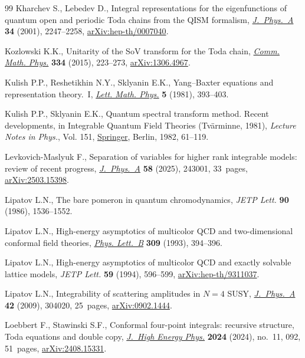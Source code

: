 \documentclass[pdftex]{sigma}
\numberwithin{equation}{section}
\begin{document}
\begin{thebibliography}{99}
Kharchev S., Lebedev D., Integral representations for the eigenfunctions of
 quantum open and periodic {T}oda chains from the {QISM} formalism,
 \href{https://doi.org/10.1088/0305-4470/34/11/317}{\textit{J.~Phys.~A}}
 \textbf{34} (2001), 2247--2258,
 \href{http://arxiv.org/abs/hep-th/0007040}{arXiv:hep-th/0007040}.

Kozlowski K.K., Unitarity of the {S}o{V} transform for the {T}oda chain,
 \href{https://doi.org/10.1007/s00220-014-2134-6}{\textit{Comm. Math. Phys.}}
 \textbf{334} (2015), 223--273,
 \href{http://arxiv.org/abs/1306.4967}{arXiv:1306.4967}.

Kulish P.P., Reshetikhin N.Y., Sklyanin E.K., {Y}ang--{B}axter equations and
 representation theory.~{I},
 \href{https://doi.org/10.1007/BF02285311}{\textit{Lett. Math. Phys.}}
 \textbf{5} (1981), 393--403.

Kulish P.P., Sklyanin E.K., Quantum spectral transform method. {R}ecent
 developments, in Integrable Quantum Field Theories ({T}v\"arminne, 1981),
 \textit{Lecture Notes in Phys.}, Vol. 151,
 \href{https://doi.org/10.1007/3-540-11190-5_8}{Springer}, Berlin, 1982,
 61--119.

Levkovich-Maslyuk F., Separation of variables for higher rank integrable
 models: review of recent progress,
 \href{https://doi.org/10.1088/1751-8121/ade103}{\textit{J.~Phys.~A}}
 \textbf{58} (2025), 243001, 33~pages,
 \href{http://arxiv.org/abs/2503.15398}{arXiv:2503.15398}.

Lipatov L.N., The bare pomeron in quantum chromodynamics, \textit{JETP Lett.}
 \textbf{90} (1986), 1536--1552.

Lipatov L.N., High-energy asymptotics of multicolor {QCD} and two-dimensional
 conformal field theories,
 \href{https://doi.org/10.1016/0370-2693(93)90951-D}{\textit{Phys. Lett.~B}}
 \textbf{309} (1993), 394--396.

Lipatov L.N., High-energy asymptotics of multicolor {QCD} and exactly solvable
 lattice models, \textit{JETP Lett.} \textbf{59} (1994), 596--599,
 \href{http://arxiv.org/abs/hep-th/9311037}{arXiv:hep-th/9311037}.

Lipatov L.N., Integrability of scattering amplitudes in {$N=4$} {SUSY},
 \href{https://doi.org/10.1088/1751-8113/42/30/304020}{\textit{J.~Phys.~A}}
 \textbf{42} (2009), 304020, 25~pages,
 \href{http://arxiv.org/abs/0902.1444}{arXiv:0902.1444}.

Loebbert F., Stawinski S.F., Conformal four-point integrals: recursive
 structure, {T}oda equations and double copy,
 \href{https://doi.org/10.1007/jhep11(2024)092}{\textit{J.~High Energy Phys.}}
 \textbf{2024} (2024), no.~11, 092, 51~pages,
 \href{http://arxiv.org/abs/2408.15331}{arXiv:2408.15331}.


\end{thebibliography}
\end{document}
